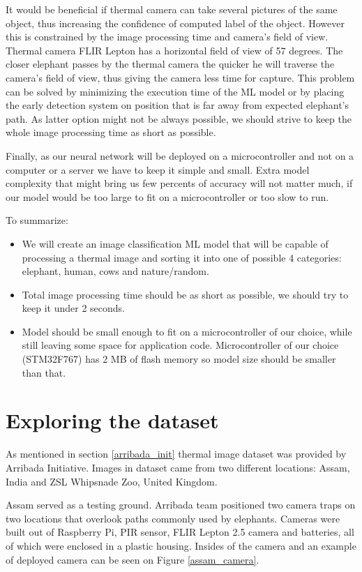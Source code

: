 It would be beneficial if thermal camera can take several pictures of the same object, thus increasing the confidence of computed label of the object.
However this is constrained by the image processing time and camera's field of view.
Thermal camera FLIR Lepton has a horizontal field of view of 57 degrees.
The closer elephant passes by the thermal camera the quicker he will traverse the camera's field of view, thus giving the camera less time for capture.
This problem can be solved by minimizing the execution time of the ML model or by placing the early detection system on position that is far away from expected elephant's path.
As latter option might not be always possible, we should strive to keep the whole image processing time as short as possible.

Finally, as our neural network will be deployed on a microcontroller and not on a computer or a server we have to keep it simple and small.
Extra model complexity that might bring us few percents of accuracy will not matter much, if our model would be too large to fit on a microcontroller or too slow to run.


To summarize:
\begin{itemize}
    \item We will create an image classification ML model that will be capable of processing a thermal image and sorting it into one of possible 4 categories: elephant, human, cows and nature/random.
    \item Total image processing time should be as short as possible, we should try to keep it under 2 seconds.
    \item Model should be small enough to fit on a microcontroller of our choice, while still leaving some space for application code. Microcontroller of our choice (STM32F767) has 2 MB of flash memory so model size should be smaller than that.
\end{itemize}


\section{ Exploring the dataset} \label{exploring_dataset}

As mentioned in section \ref{arribada_init} thermal image dataset was provided by Arribada Initiative\cite{wildlabs-winners}\cite{arribada-assam}.
Images in dataset came from two different locations: Assam, India and ZSL Whipsnade Zoo, United Kingdom.

Assam served as a testing ground.
Arribada team positioned two camera traps on two locations that overlook paths commonly used by elephants.
Cameras were built out of Raspberry Pi, PIR sensor, FLIR Lepton 2.5 camera and batteries, all of which were enclosed in a plastic housing.
Insides of the camera and an example of deployed camera can be seen on Figure \ref{assam_camera}.

